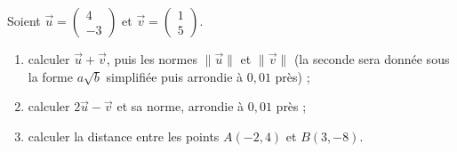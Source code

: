 \begin{exercice}
Soient $\vec{u} = \begin{pmatrix} 4 \\ -3 \end{pmatrix}$ et $\vec{v} = \begin{pmatrix} 1 \\ 5 \end{pmatrix}$.
\begin{enumerate}
\item calculer $\vec{u} + \vec{v}$, puis les normes $\|\vec{u}\|$ et $\|\vec{v}\|$ (la seconde sera donnée sous la forme $a\sqrt{b}$ simplifiée puis arrondie à $0{,}01$ près) ;
\item calculer $2\vec{u} - \vec{v}$ et sa norme, arrondie à $0{,}01$ près ;
\item calculer la distance entre les points $A(-2, 4)$ et $B(3, -8)$.
\end{enumerate}
\end{exercice}
